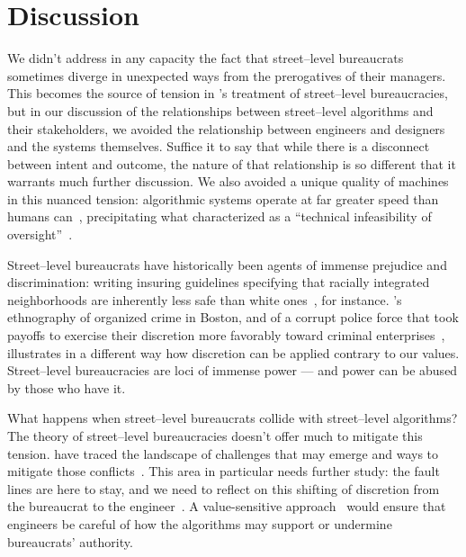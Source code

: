 \documentclass[street-level_algorithms]{subfiles}
\begin{document}
\section{Discussion}

We didn't address in any capacity the fact that
street--level bureaucrats sometimes diverge in unexpected ways from the prerogatives of their managers.
This becomes the source of tension in
\citeauthor{lipsky1983street}'s treatment of street--level bureaucracies,
but in our discussion of the relationships between street--level algorithms and their stakeholders,
we avoided the relationship between engineers and designers and the systems themselves.
Suffice it to say that while there is a disconnect between intent and outcome,
the nature of that relationship is so different that it warrants much further discussion.
We also avoided a unique quality of machines in this nuanced tension:
algorithmic systems operate at far greater speed than humans can~\cite{Matthias2004},
precipitating what \citeauthor{doi:10.1177/2053951716679679} characterized as a
``technical infeasibility of oversight''~\cite{doi:10.1177/2053951716679679}.


Street--level bureaucrats have historically been agents of immense prejudice and discrimination:
writing insuring guidelines specifying that racially integrated neighborhoods are
inherently less safe than white ones~\cite{rothstein2017color}, for instance.
\citeauthor{whyte2012street}'s ethnography of organized crime in Boston,
and of a corrupt police force
that took payoffs to exercise their discretion more favorably toward criminal enterprises~\cite{whyte2012street},
illustrates in a different way how discretion can be applied contrary to our values.
Street--level bureaucracies are loci of immense power
--- and power can be abused by those who have it.

What happens when street--level bureaucrats collide with street--level algorithms?
The theory of street--level bureaucracies doesn't offer much to mitigate this tension.
\citeauthor{Veale:2018:FAD:3173574.3174014,doi:10.1177/2053951717718855} have
traced the landscape of challenges that may emerge
and ways to mitigate those conflicts~\cite{Veale:2018:FAD:3173574.3174014,doi:10.1177/2053951717718855}.
This area in particular needs further study:
the fault lines are here to stay, and we need to reflect on
this shifting of discretion from the bureaucrat to the engineer~\cite{eubanks2018automating}.
A value-sensitive approach~\cite{zhuvalue} would ensure that engineers be careful of
how the algorithms may support or undermine bureaucrats' authority.
\end{document}
